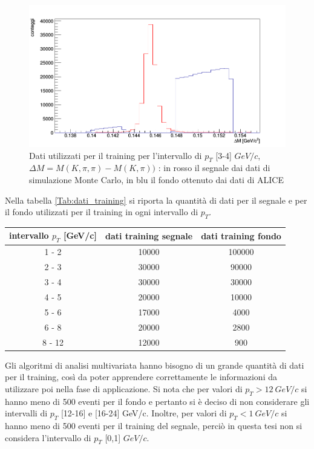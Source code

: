     \begin{figure}[htbp] 
        \centering
        \includegraphics[width=0.9\linewidth]{training&testing/diffDstarD0_training_3_4_ok.png}
        \caption{Dati utilizzati per il training per l'intervallo di $p_T$ [3-4] $GeV/c$, $\Delta M = M(K,\pi,\pi)-M(K,\pi))$ : in rosso il segnale dai dati di simulazione Monte Carlo, in blu il fondo ottenuto dai dati di ALICE}
        \label{fig:dati_training}
    \end{figure}
    
 Nella tabella \ref{Tab:dati_training} si riporta la quantità di dati per il segnale e per il fondo utilizzati per il training in ogni intervallo di $p_T$. 
 
      \begin{table}[H]
		\centering
		\begin{tabular}{c|c|c}
		    \toprule
		    intervallo $p_T$ [GeV/c]  &   dati training segnale & dati training fondo  \\
            \midrule
            1 - 2  	&  10000   &  100000  \\ 
            2 - 3 	&  30000   &  90000  \\
            3 - 4  	&  30000   &  30000  \\ 
            4 - 5  	&  20000   &  10000 \\ 
            5 - 6  	&  17000   &  4000  \\ 
            6 - 8  	&  20000   &  2800  \\ 
            8 - 12  &  12000   &   900 \\   
			\bottomrule
		\end{tabular}
	\end{table}
	
Gli algoritmi di analisi multivariata hanno bisogno di un grande quantità di dati per il training, così da poter apprendere correttamente le informazioni da utilizzare poi nella fase di applicazione. Si nota che per valori di $p_T > 12  \ GeV/c$ si hanno meno di 500 eventi per il fondo e pertanto si è deciso di non considerare gli intervalli di $p_T$ [12-16] e [16-24] GeV/c. Inoltre, per valori di $p_T < 1 \ GeV/c$ si hanno meno di 500 eventi per il training del segnale, perciò in questa tesi non si considera l'intervallo di $p_T$ [0,1] $GeV/c$.
 
